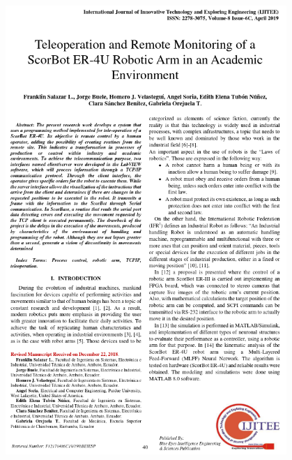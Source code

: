 \begin{figure}[ht]
    \centering
    \includegraphics[width=0.95\textwidth]{5.-Publicaciones/Certificados/1.png}
\end{figure}
